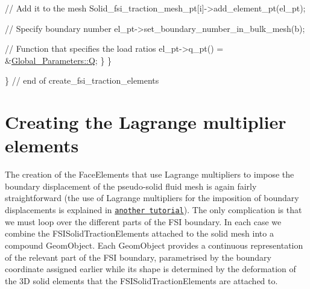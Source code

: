 \begin{DoxyCodeInclude}
     
     \textcolor{comment}{// Add it to the mesh}
     Solid\_fsi\_traction\_mesh\_pt[i]->add\_element\_pt(el\_pt);
     
     \textcolor{comment}{// Specify boundary number}
     el\_pt->set\_boundary\_number\_in\_bulk\_mesh(b);
     
     \textcolor{comment}{// Function that specifies the load ratios}
     el\_pt->q\_pt() = &\hyperlink{namespaceGlobal__Parameters_a7814fddf663e56168174a42d2cd6b4c1}{Global\_Parameters::Q}; 
    \}
  \}
 
\} \textcolor{comment}{// end of create\_fsi\_traction\_elements}

\end{DoxyCodeInclude}




 

\hypertarget{index_create_lagr}{}\section{Creating the Lagrange multiplier elements}\label{index_create_lagr}
The creation of the {\ttfamily Face\+Elements} that use Lagrange multipliers to impose the boundary displacement of the pseudo-\/solid fluid mesh is again fairly straightforward (the use of Lagrange multipliers for the imposition of boundary displacements is explained in \href{../../../solid/prescribed_displ_lagr_mult/html/index.html}{\tt another tutorial}). The only complication is that we must loop over the different parts of the F\+SI boundary. In each case we combine the {\ttfamily F\+S\+I\+Solid\+Traction\+Elements} attached to the solid mesh into a compound {\ttfamily Geom\+Object}. Each {\ttfamily Geom\+Object} provides a continuous representation of the relevant part of the F\+SI boundary, parametrised by the boundary coordinate assigned earlier while its shape is determined by the deformation of the 3D solid elements that the {\ttfamily F\+S\+I\+Solid\+Traction\+Elements} are attached to.



